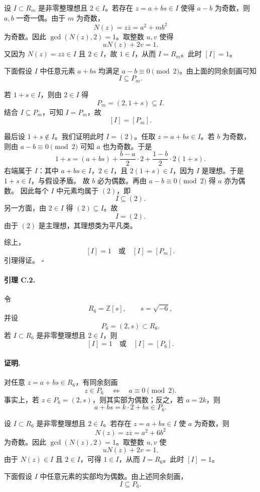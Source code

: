 设 \(I\subset R_m\) 是非零整理想且 \(2\in I\)。若存在
\(z=a+bs\in I\) 使得 \(a-b\) 为奇数，则 \(a,b\) 一奇一偶。由于
\(m\) 为奇数，
\[
N(z)=z\overline z=a^2+mb^2
\]
为奇数。因此 \(\gcd(N(z),2)=1\)。取整数 \(u,v\) 使得
\[
uN(z)+2v=1.
\]
又因为 \(N(z)=z\overline z\in I\) 且 \(2\in I\)，故 \(1\in I\)，从而
\(I=R_m\)。此时 \([I]=1\)。

下面假设 \(I\) 中任意元素 \(a+bs\) 均满足
\(a-b\equiv0\pmod2\)。由上面的同余刻画可知
\[
I\subseteq P_m.
\]

若 \(1+s\in I\)，则由 \(2\in I\) 得
\[
P_m=(2,1+s)\subseteq I.
\]
结合 \(I\subseteq P_m\)，可知 \(I=P_m\)，故
\[
[I]=[P_m].
\]

最后设 \(1+s\notin I\)。我们证明此时 \(I=(2)\)。任取
\(z=a+bs\in I\)。若 \(b\) 为奇数，则由
\(a-b\equiv0\pmod2\) 可知 \(a\) 也为奇数。于是
\[
1+s
=
(a+bs)+\frac{b-a}{2}\cdot2+\frac{1-b}{2}\cdot2(1+s).
\]
右端属于 \(I\)：其中 \(a+bs\in I\)，\(2\in I\)，且
\(2(1+s)\in I\)，因为 \(I\) 是理想。于是 \(1+s\in I\)，与假设矛盾。
故 \(b\) 必为偶数。再由 \(a-b\equiv0\pmod2\) 得 \(a\) 亦为偶数。
因此每个 \(I\) 中元素均属于 \((2)\)，即
\[
I\subseteq(2).
\]
另一方面，由 \(2\in I\) 得 \((2)\subseteq I\)。故
\[
I=(2).
\]
由于 \((2)\) 是主理想，其理想类为平凡类。

综上，
\[
[I]=1\quad\text{或}\quad [I]=[P_m].
\]
引理得证。 \(\square\)

\paragraph{引理 C.2.}
令
\[
R_6=\mathbb Z[s],\qquad s=\sqrt{-6},
\]
并设
\[
P_6=(2,s)\subset R_6.
\]
若 \(I\subset R_6\) 是非零整理想且 \(2\in I\)，则
\[
[I]=1\quad\text{或}\quad [I]=[P_6].
\]

\paragraph{证明.}
对任意 \(z=a+bs\in R_6\)，有同余刻画
\[
z\in P_6
\quad\Longleftrightarrow\quad
 a\equiv0\pmod2.
\]
事实上，若 \(z\in P_6=(2,s)\)，则其实部为偶数；反之，若
\(a=2k\)，则
\[
a+bs=k\cdot2+bs\in P_6.
\]

设 \(I\subset R_6\) 是非零整理想且 \(2\in I\)。若存在
\(z=a+bs\in I\) 使 \(a\) 为奇数，则
\[
N(z)=z\overline z=a^2+6b^2
\]
为奇数。因此 \(\gcd(N(z),2)=1\)。取整数 \(u,v\) 使
\[
uN(z)+2v=1.
\]
由于 \(N(z)\in I\) 且 \(2\in I\)，可得 \(1\in I\)，从而
\(I=R_6\)。此时 \([I]=1\)。

下面假设 \(I\) 中任意元素的实部均为偶数。由上述同余刻画，
\[
I\subseteq P_6.
\]

